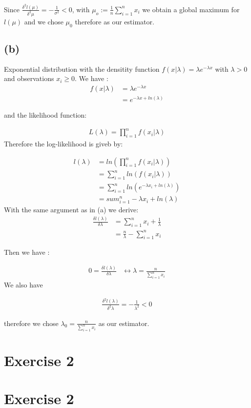 \documentclass{article}
\begin{document}
Since $\frac{\delta^2 l(\mu)}{\delta^2 \mu} = -\frac{1}{\sigma^2}< 0$, with $\mu_o := \frac{1}{n} \sum_{i=1}^n x_i$ we obtain a global maximum for $l(\mu)$ and we chose $\mu_0$ therefore as our estimator.

\subsection*{(b)}

Exponential distribution with the densitity function $f(x|\lambda)= \lambda e^{-\lambda x}$ with $\lambda > 0$ and observations $x_i \geq 0$.
We have :
\begin{align*}
    f(x|\lambda) &= \lambda e^{-\lambda x}\\
                &= e^{-\lambda x +ln(\lambda)}
\end{align*}

and the likelihood function:

\begin{align*}
    L(\lambda)= \prod_{i=1}^n f(x_i | \lambda)
\end{align*}
Therefore the log-likelihood is giveb by:

\begin{align*}
    l(\lambda)  &= ln(\prod_{i=1}^n f(x_i | \lambda)) \\
                &= \sum_{i=1}^n ln(f(x_i| \lambda))\\
                &= \sum_{i=1}^n ln( e^{-\lambda x_i +ln(\lambda)})\\
                &= sum_{i=1}^n -\lambda x_i +ln(\lambda)
\end{align*}
With the same argument as in (a) we derive:
\begin{align*}
\frac{\delta l(\lambda)}{\delta \lambda}     &= \sum_{i=1}^n x_i + \frac{1}{\lambda} \\
                                            &= \frac{n}{\lambda} - \sum_{i=1}^n x_i
\end{align*}

Then we have :

\begin{align*}
    0  = \frac{\delta l(\lambda)}{\delta \lambda}    & \leftrightarrow \lambda = \frac{n}{\sum_{i=1}^n x_i}
\end{align*}
We also have 

\begin{align*}
    \frac{\delta^2 l(\lambda)}{\delta^2 \lambda} = -\frac{1}{\lambda^2}<0
\end{align*}

therefore we chose $\lambda_0 =  \frac{n}{\sum_{i=1}^n x_i}$ as our estimator.
\section*{Exercise 2}

\section*{Exercise 2}
\end{document}
